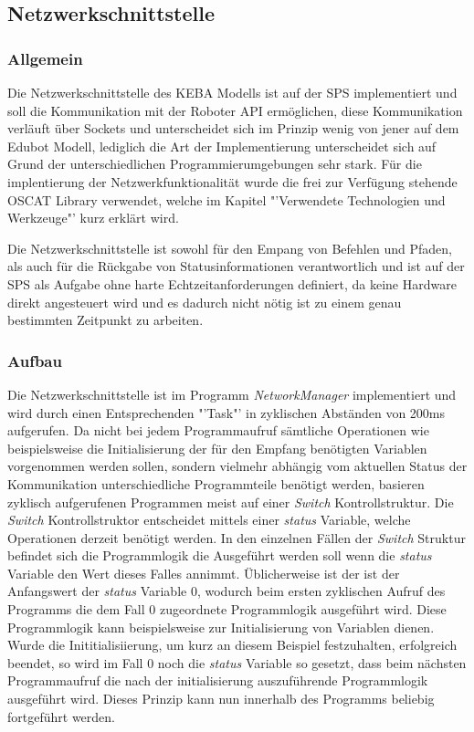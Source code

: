 \subsection{Netzwerkschnittstelle}
\subsubsection{Allgemein}
Die Netzwerkschnittstelle des KEBA Modells ist auf der SPS implementiert und soll die Kommunikation mit der Roboter API ermöglichen, diese Kommunikation verläuft über Sockets und unterscheidet sich im Prinzip wenig von jener auf dem Edubot Modell, lediglich die Art der Implementierung unterscheidet sich auf Grund der unterschiedlichen Programmierumgebungen sehr stark. Für die implentierung der Netzwerkfunktionalität wurde die frei zur Verfügung stehende OSCAT Library verwendet, welche im Kapitel "'Verwendete Technologien und Werkzeuge"' kurz erklärt wird. 

Die Netzwerkschnittstelle ist sowohl für den Empang von Befehlen und Pfaden, als auch für die Rückgabe von Statusinformationen verantwortlich und ist auf der SPS als Aufgabe ohne harte Echtzeitanforderungen definiert, da keine Hardware direkt angesteuert wird und es dadurch nicht nötig ist zu einem genau bestimmten Zeitpunkt zu arbeiten.

\subsubsection{Aufbau}
Die Netzwerkschnittstelle ist im Programm \textit{NetworkManager} implementiert und wird durch einen Entsprechenden "'Task"' in zyklischen Abständen von 200ms aufgerufen. Da nicht bei jedem Programmaufruf sämtliche Operationen wie beispielsweise die Initialisierung der für den Empfang benötigten Variablen vorgenommen werden sollen, sondern vielmehr abhängig vom aktuellen Status der Kommunikation unterschiedliche Programmteile benötigt werden, basieren zyklisch aufgerufenen Programmen meist auf einer \textit{Switch} Kontrollstruktur. Die \textit{Switch} Kontrollstruktor entscheidet mittels einer \textit{status} Variable, welche Operationen derzeit benötigt werden. In den einzelnen Fällen der \textit{Switch} Struktur befindet sich die Programmlogik die Ausgeführt werden soll wenn die \textit{status} Variable den Wert dieses Falles annimmt. Üblicherweise ist der ist der Anfangswert der \textit{status} Variable 0, wodurch beim ersten zyklischen Aufruf des Programms die dem Fall 0 zugeordnete Programmlogik ausgeführt wird. Diese Programmlogik kann beispielsweise zur Initialisierung von Variablen dienen. Wurde die Inititialisiierung, um kurz an diesem Beispiel festzuhalten, erfolgreich beendet, so wird im Fall 0 noch die \textit{status} Variable so gesetzt, dass beim nächsten Programmaufruf die nach der initialisierung auszuführende Programmlogik ausgeführt wird. Dieses Prinzip kann nun innerhalb des Programms beliebig fortgeführt werden.

